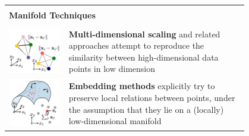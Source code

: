 \documentclass[11pt]{article}
\theoremstyle{definition}
\begin{document}
\begin{tabularx}{\linewidth}{m{0.2\linewidth} m{0.6\linewidth}}
	& \\
	\multicolumn{2}{l}{\textbf{Manifold Techniques}}\\
	\hline
	&\\[-0.5em]
	\includegraphics[width=\linewidth]{img/multi-dimensional_scaling} & \textbf{Multi-dimensional scaling} and related approaches attempt to reproduce the similarity between high-dimensional data points in low dimension\\
	\includegraphics[width=\linewidth]{img/embedding_methods} & \textbf{Embedding methods} explicitly try to preserve local relations between points, under the assumption that they lie on a (locally) low-dimensional manifold
\end{tabularx}
\end{document}
